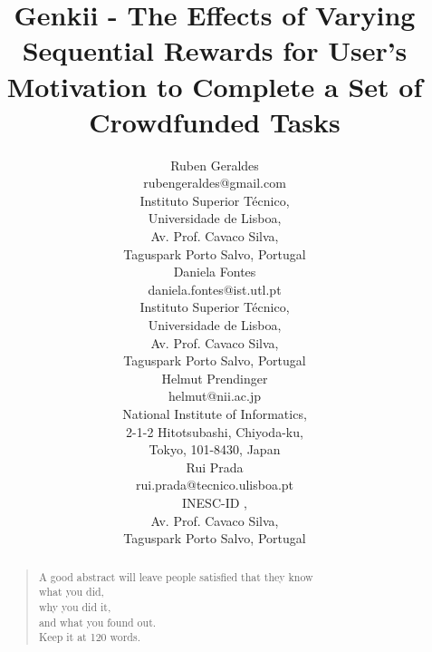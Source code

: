 \documentclass[letterpaper]{article}
\begin{document}
 
%
\title{Genkii - The Effects of Varying Sequential Rewards for User's Motivation to Complete a Set of Crowdfunded Tasks}
\author{Ruben Geraldes \\
rubengeraldes@gmail.com \\
Instituto Superior T\'{e}cnico, \\ Universidade de Lisboa,\\
	Av. Prof. Cavaco Silva, \\ Taguspark Porto Salvo, Portugal\\ 
	\And Daniela Fontes\\
	daniela.fontes@ist.utl.pt \\
	Instituto Superior T\'{e}cnico, \\ Universidade de Lisboa,\\
	Av. Prof. Cavaco Silva, \\ Taguspark Porto Salvo, Portugal\\
	\AND Helmut Prendinger \\
	helmut@nii.ac.jp\\
	National Institute of Informatics,\\
	2-1-2 Hitotsubashi, Chiyoda-ku, \\ Tokyo, 101-8430, Japan \\ 
	\And Rui Prada\\
	rui.prada@tecnico.ulisboa.pt\\
	INESC-ID ,\\
	Av. Prof. Cavaco Silva, \\ Taguspark Porto Salvo, Portugal\\		
}



\maketitle


\begin{abstract}
		
\begin{quote}
A good abstract will leave people satisfied that they know
\\ what you did, \\ why you did it, \\ and what you found out. 
\\ Keep it at 120 words.
\end{quote}
\end{abstract}
\end{document}
